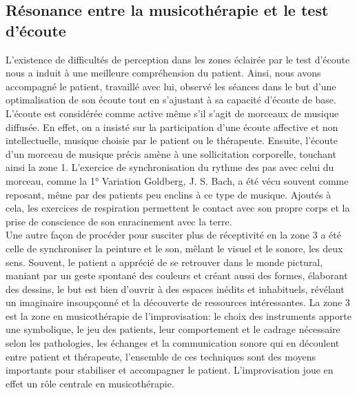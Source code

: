 \subsection{Résonance entre %
	la musicothérapie et le test d'écoute}
L'existence de difficultés de perception dans les zones éclairée par le test d'écoute nous a
	induit à une meilleure compréhension du patient. %
	  Ainsi, nous avons accompagné le patient, travaillé avec lui, observé les séances dans le but d'une 
	  optimalisation de 
	son écoute %
	tout en s'ajustant  à sa 
	capacité 
	d'écoute de base.
		\\
L'écoute est considérée comme active même s'il s'agit de morceaux de musique diffusée. En effet,  on a 
insisté sur la participation d'une écoute affective et non intellectuelle, 
musique choisie par le patient ou le thérapeute.
Ensuite, l'écoute d'un morceau de musique précis amène à une sollicitation corporelle, touchant 
ainsi  la zone 1. 
L'exercice de synchronisation du rythme des pas avec celui du morceau, comme  la 1° 
Variation Goldberg, J. S. Bach,  a été vécu souvent comme reposant, même par des patients peu 
enclins à ce type 
de musique. Ajoutés à cela, les exercices de respiration 
permettent le contact avec 
son propre corps et la prise de conscience de son enracinement avec la terre.
\\	
Une autre façon de procéder pour susciter plus de réceptivité en la zone 3 a été celle de 
synchroniser la 
peinture et 
le son, mêlant le visuel et le sonore, les deux sens.  Souvent, le patient a apprécié de se 
retrouver dans le monde 
pictural, maniant  par un geste spontané des couleurs et créant aussi des formes, élaborant des dessins,
le but est bien d'ouvrir à des espaces inédits et  inhabituels, révélant un imaginaire insoupçonné et 
la découverte de ressources intéressantes.
La zone 3 est la zone en musicothérapie de l'improvisation: le choix des instruments apporte une 
symbolique, 
le jeu des patients, leur comportement et  le cadrage nécessaire selon les pathologies, les 
échanges et la communication sonore qui en découlent entre patient et thérapeute, l'ensemble de ces 
techniques sont des moyens importants pour stabiliser et accompagner le patient. L'improvisation joue 
en effet un 
rôle centrale en musicothérapie.\autocite {hegi_improvisation_1993}
  
